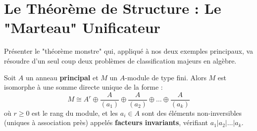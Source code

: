\section{Le Théorème de Structure : Le "Marteau" Unificateur}

\begin{objectif}
    Présenter le "théorème monstre" qui, appliqué à nos deux exemples principaux, va résoudre d'un seul coup deux problèmes de classification majeurs en algèbre.
\end{objectif}

\begin{theorem}
    Soit $A$ un anneau \textbf{principal} et $M$ un $A$-module de type fini. Alors $M$ est isomorphe à une somme directe unique de la forme :
    $$ M \cong A^r \oplus \frac{A}{(a_1)} \oplus \frac{A}{(a_2)} \oplus \dots \oplus \frac{A}{(a_k)} $$
    où $r \geq 0$ est le rang du module, et les $a_i \in A$ sont des éléments non-inversibles (uniques à association près) appelés \textbf{facteurs invariants}, vérifiant $a_1 | a_2 | \dots | a_k$.
\end{theorem}

